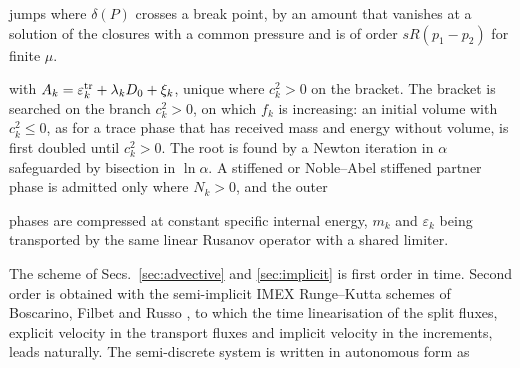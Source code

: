 jumps where $\delta(P)$ crosses a break point, by an amount that vanishes at a solution of the closures with a common pressure
and is of order $sR(p_1-p_2)$ for finite $\mu$.

with $A_k=\varepsilon^{\rm tr}_k+\lambda_kD_0+\xi_k$, unique where $c_k^2>0$ on the bracket. The bracket is searched on the branch
$c_k^2>0$, on which $f_k$ is increasing: an initial volume with $c_k^2\le0$, as for a trace phase that has received mass and energy
without volume, is first doubled until $c_k^2>0$. The root is found by a Newton iteration in $\alpha$ safeguarded by bisection
in $\ln\alpha$. A stiffened or Noble--Abel stiffened partner phase is admitted only where $N_k>0$, and the outer

phases are compressed at constant specific internal energy, $m_k$ and $\varepsilon_k$ being transported by the same linear Rusanov operator with a shared limiter.

The scheme of Secs.~\ref{sec:advective} and \ref{sec:implicit} is first order in time. Second order is obtained with the
semi-implicit IMEX Runge--Kutta schemes of Boscarino, Filbet and Russo \cite{BoscarinoFilbetRusso2016}, to which the time
linearisation of the split fluxes, explicit velocity in the transport fluxes and implicit velocity in the increments, leads
naturally. The semi-discrete system is written in autonomous form as

